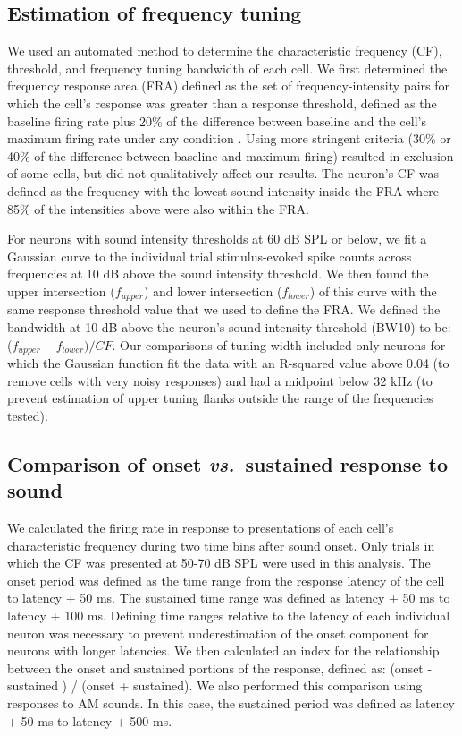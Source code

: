 \subsection{Estimation of frequency tuning}
%
We used an automated method to determine the characteristic frequency (CF), threshold, and frequency tuning bandwidth of each cell.
%
We first determined the frequency response area (FRA) defined as the set of frequency-intensity pairs for which the cell’s response was greater than a response threshold, defined as the baseline firing rate plus 20\% of the difference between baseline and the cell’s maximum firing rate under any condition \citep{Sutter1991, Schumacher2011}.
%
Using more stringent criteria (30\% or 40\% of the difference between baseline and maximum firing) resulted in exclusion of some cells, but did not qualitatively affect our results.
%
The neuron’s CF was defined as the frequency with the lowest sound intensity inside the FRA where 85\% of the intensities above were also within the FRA.

For neurons with sound intensity thresholds at 60 dB SPL or below, we fit a Gaussian curve to the individual trial stimulus-evoked spike counts across frequencies at 10 dB above the sound intensity threshold. 
%
We then found the upper intersection ($f_{upper}$) and lower intersection ($f_{lower}$) of this curve with the same response threshold value that we used to define the FRA. 
%
We defined the bandwidth at 10 dB above the neuron's sound intensity threshold (BW10) to be: ($f_{upper} - f_{lower})/CF$.
%
Our comparisons of tuning width included only neurons for which the Gaussian function fit the data with an R-squared value above 0.04 (to remove cells with very noisy responses) and had a midpoint below 32 kHz (to prevent estimation of upper tuning flanks outside the range of the frequencies tested). 

\subsection{Comparison of onset \emph{vs.}\ sustained response to sound}
We calculated the firing rate in response to presentations of each cell's characteristic frequency during two time bins after sound onset.
%
Only trials in which the CF was presented at 50-70 dB SPL were used in this analysis.
%
The onset period was defined as the time range from the response latency of the cell to latency + 50 ms.
%
The sustained time range was defined as latency + 50 ms to latency + 100 ms.
%
Defining time ranges relative to the latency of each individual neuron was necessary to prevent underestimation of the onset component for neurons with longer latencies.
%
We then calculated an index for the relationship between the onset and sustained portions of the response, defined as: (onset - sustained ) / (onset + sustained). 
%
We also performed this comparison using responses to AM sounds.
%
In this case, the sustained period was defined as latency + 50 ms to latency + 500 ms.
%

